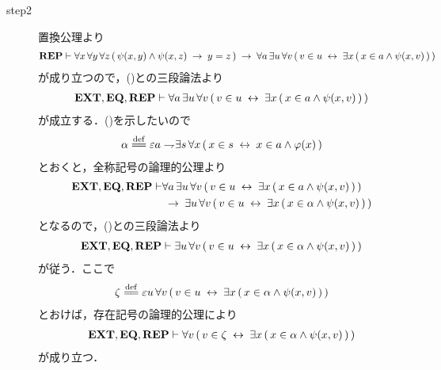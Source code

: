 \begin{sketch}
\begin{description}
			\item[step2]
				置換公理より
				\begin{align}
					\mbox{{\bf REP}} \vdash \forall x\, \forall y\, \forall z\, 
					(\, \psi(x,y) \wedge \psi(x,z)
					\hspace{0.25em}\rightarrow\hspace{0.25em} y = z\, )
					\hspace{0.25em}\rightarrow\hspace{0.25em} \forall a\, \exists u\, \forall v\,
					(\, v \in u \hspace{0.25em}\leftrightarrow\hspace{0.25em} \exists x\, (\, x \in a \wedge 
					\psi(x,v)\, )\, )
				\end{align}
				が成り立つので，()との三段論法より
				\begin{align}
					\mbox{{\bf EXT}},\mbox{{\bf EQ}},\mbox{{\bf REP}} \vdash \forall a\, \exists u\, \forall v\,
					(\, v \in u \hspace{0.25em}\leftrightarrow\hspace{0.25em} \exists x\, (\, x \in a \wedge 
					\psi(x,v)\, )\, )
					\label{fom:thm_axiom_of_separation_2}
				\end{align}
				が成立する．()を示したいので
				\begin{align}
					\alpha \defeq \varepsilon a \negation \exists s\, \forall x\,
					(\, x \in s \lrarrow x \in a \wedge \varphi(x)\, )
				\end{align}
				とおくと，全称記号の論理的公理より
				\begin{align}
					\mbox{{\bf EXT}},\mbox{{\bf EQ}},\mbox{{\bf REP}} \vdash &\forall a\, \exists u\, \forall v\,
					(\, v \in u \hspace{0.25em}\leftrightarrow\hspace{0.25em} \exists x\, (\, x \in a \wedge 
					\psi(x,v)\, )\, ) \\
					&\hspace{0.25em}\rightarrow\hspace{0.25em} \exists u\, \forall v\,
					(\, v \in u \hspace{0.25em}\leftrightarrow\hspace{0.25em} \exists x\, (\, x \in \alpha \wedge 
					\psi(x,v)\, )\, )
				\end{align}
				となるので，()との三段論法より
				\begin{align}
					\mbox{{\bf EXT}},\mbox{{\bf EQ}},\mbox{{\bf REP}} \vdash \exists u\, \forall v\,
					(\, v \in u \hspace{0.25em}\leftrightarrow\hspace{0.25em} \exists x\, (\, x \in \alpha \wedge 
					\psi(x,v)\, )\, )
					\label{fom:thm_axiom_of_separation_3}
				\end{align}
				が従う．ここで
				\begin{align}
					\zeta \defeq \varepsilon u\, \forall v\,
					(\, v \in u \lrarrow \exists x\, (\, x \in \alpha \wedge 
					\psi(x,v)\, )\, )
				\end{align}
				とおけば，存在記号の論理的公理により
				\begin{align}
					\mbox{{\bf EXT}},\mbox{{\bf EQ}},\mbox{{\bf REP}} \vdash \forall v\,
					(\, v \in \zeta \hspace{0.25em}\leftrightarrow\hspace{0.25em} \exists x\, (\, x \in \alpha \wedge 
					\psi(x,v)\, )\, )
					\label{fom:thm_axiom_of_separation_4}
				\end{align}
				が成り立つ．
			

\end{description}
\end{sketch}
